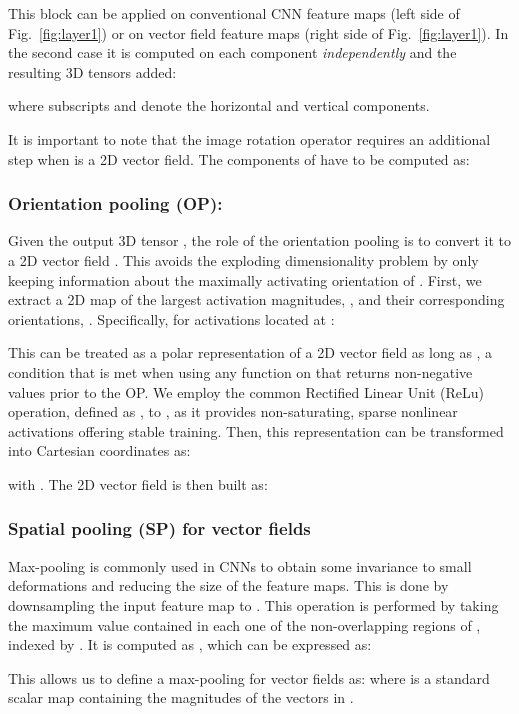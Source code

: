 \documentclass[10pt,twocolumn,letterpaper,table]{article}
\begin{document}
This block can be applied on conventional CNN feature maps (left side of Fig.~\ref{fig:layer1}) or on vector field feature maps (right side of Fig.~\ref{fig:layer1}). In the second case it is computed on each component \emph{independently} and the resulting 3D tensors added:

where subscripts  and  denote the horizontal and vertical components. 
	
It is important to note that the image rotation operator  requires an additional step when  is a 2D vector field. The components of  have to be computed as:

\subsubsection{Orientation pooling (OP):}

Given the output 3D tensor , the role of the orientation pooling is to convert it to a 2D vector field . This avoids the exploding dimensionality problem by only keeping information about the maximally activating orientation of . First, we extract a 2D map of the largest activation magnitudes, , and their corresponding orientations, . Specifically, for activations located at :

This can be treated as a polar representation of a 2D vector field as long as , a condition that is met when using any function on  that returns non-negative values prior to the OP. We employ the common Rectified Linear Unit (ReLu) operation, defined as , to , as it provides non-saturating, sparse nonlinear activations offering stable training. Then, this representation can be transformed into Cartesian coordinates as:

with . The 2D vector field  is then built as:

	




\subsubsection{Spatial pooling (SP) for vector fields}
	
Max-pooling is commonly used in CNNs to obtain some invariance to small deformations and reducing the size of the feature maps. This is done by downsampling the input feature map  to . This operation is performed by taking the maximum value contained in each one of the  non-overlapping  regions of , indexed by . It is computed as , which can be expressed as:

This allows us to define a max-pooling for vector fields as:
where  is a standard scalar map containing the magnitudes of the vectors in .
	
\end{document}
